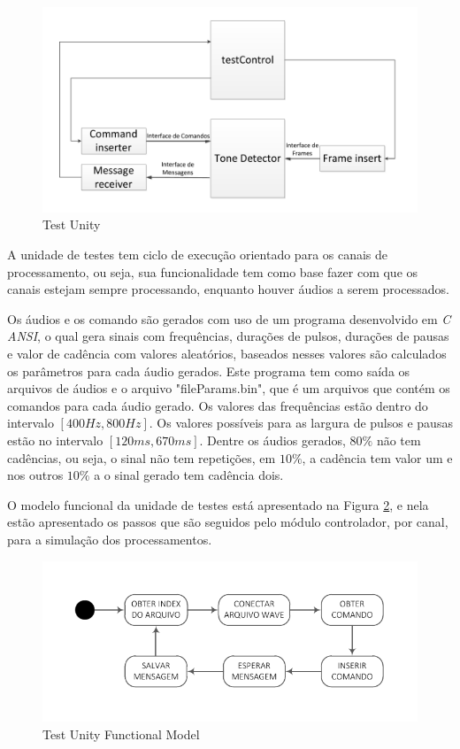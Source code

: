 \documentclass[monografia]{subfiles}
\begin{document}
				\begin{figure}[!h]
				\centering 
					\includegraphics[scale=0.55]{img/modulos/mod_testControl.pdf}
				\caption{Test Unity}
				\label{fig:testUnityBlock}
				\end{figure}	

			A unidade de testes tem ciclo de execução orientado para os canais de processamento, ou seja, sua funcionalidade tem como base
			fazer com que os canais estejam sempre processando, enquanto houver áudios a serem processados. 

			Os áudios e os comando são gerados com uso de um programa desenvolvido em \textit{C ANSI}, o qual gera sinais com frequências, durações de pulsos,
			durações de pausas e valor de cadência com valores aleatórios, baseados nesses valores são calculados os parâmetros para cada áudio gerados.
			Este programa tem como saída os arquivos de áudios e o arquivo "fileParams.bin", que é um arquivos que contém
			os comandos para cada áudio gerado.
			Os valores das frequências estão dentro do intervalo $[400 Hz, 800 Hz]$. Os valores possíveis para as largura de pulsos e pausas estão no intervalo
			$[120 ms, 670 ms]$. Dentre os áudios gerados, $80\%$ não tem cadências, ou seja, o sinal não tem repetições, em $10\%$, a cadência tem valor um e nos
			outros $10\%$ a o sinal gerado tem cadência dois.

			O modelo funcional da unidade de testes está apresentado na Figura \ref{fig:testUnityFunctionalModel}, e nela estão apresentado os passos que 
			são seguidos pelo módulo controlador, por canal, para a simulação dos processamentos.

				\begin{figure}[!h]
				\centering
					\includegraphics[scale=1.3]{img/stateMachines/unitTest.pdf}
				\caption{Test Unity Functional Model}
				\label{fig:testUnityFunctionalModel}
				\end{figure}
\end{document}
